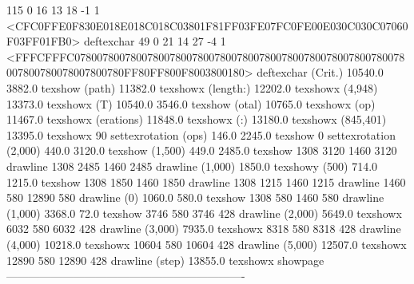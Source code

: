 115 0 16 13 18 -1 1 {{<CFC0FFE0F830E018E018C018C03801F81FF03FE07FC0FE00E030C030C07060F03FF01FB0>}} deftexchar
49 0 21 14 27 -4 1 {{<FFFCFFFC07800780078007800780078007800780078007800780078007800780078007800780078007800780FF80FF800F8003800180>}} deftexchar
(Crit.) 10540.0 3882.0 texshow
(path) 11382.0 texshowx
(length:) 12202.0 texshowx
(4,948) 13373.0 texshowx
(T) 10540.0 3546.0 texshow
(otal) 10765.0 texshowx
(op) 11467.0 texshowx
(erations) 11848.0 texshowx
(:) 13180.0 texshowx
(845,401) 13395.0 texshowx
90 settexrotation
(ops) 146.0 2245.0 texshow
0 settexrotation
(2,000) 440.0 3120.0 texshow
(1,500) 449.0 2485.0 texshow
1308 3120 1460 3120 drawline
1308 2485 1460 2485 drawline
(1,000) 1850.0 texshowy
(500) 714.0 1215.0 texshow
1308 1850 1460 1850 drawline
1308 1215 1460 1215 drawline
1460 580 12890 580 drawline
(0) 1060.0 580.0 texshow
1308 580 1460 580 drawline
(1,000) 3368.0 72.0 texshow
3746 580 3746 428 drawline
(2,000) 5649.0 texshowx
6032 580 6032 428 drawline
(3,000) 7935.0 texshowx
8318 580 8318 428 drawline
(4,000) 10218.0 texshowx
10604 580 10604 428 drawline
(5,000) 12507.0 texshowx
12890 580 12890 428 drawline
(step) 13855.0 texshowx
showpage
----------------------------------------------------------------

